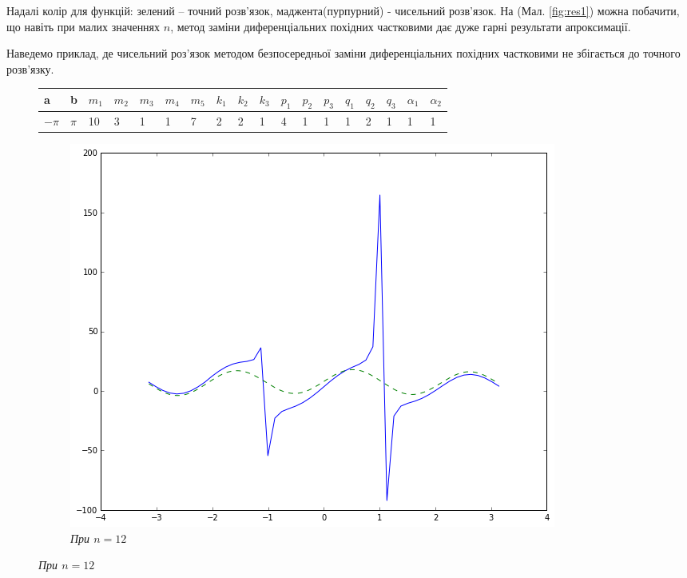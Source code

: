 Надалі колір для функцій: зелений -- точний розв'язок, маджента(пурпурний) - чисельний розв'язок. На (Мал. \ref{fig:res1}) можна побачити, що навіть при малих значеннях \(n\), метод заміни диференціальних похідних частковими дає дуже гарні результати апроксимації.

\bigskip



Наведемо приклад, де чисельний роз'язок методом безпосередньої заміни диференціальних похідних частковими не збігається до точного розв'язку.

\bigskip

\begin{figure}[h!]
\begin{center}
    \begin{tabular}{| l | l | l | l | l | l | l | l | l | l | l | l | l | l | l | l | l | l |}
	\hline
	a & b & $m_1$ & $m_2$ & $m_3$ & $m_4$ & $m_5$ & $k_1$ & $k_2$ & $k_3$ & $p_1$ & $p_2$ & $p_3$ & $q_1$ & $q_2$ & $q_3$ & $\alpha_1$ & $\alpha_2$ \\\hline
	$-\pi$ & $\pi$ & 10 & 3 & 1 & 1 & 7 & 2 & 2 & 1 & 4 & 1 & 1 & 1 & 2 & 1 & 1 & 1\\ \hline
    \end{tabular}
\end{center}
\bigskip
\centering
\begin{subfigure}{.5\textwidth}
  \centering
  \includegraphics[width=.95\linewidth]{res2_n50}
  \caption{\it При \(n = 12\)}
  \label{fig:sub1}
\end{subfigure}%

\end{figure}
